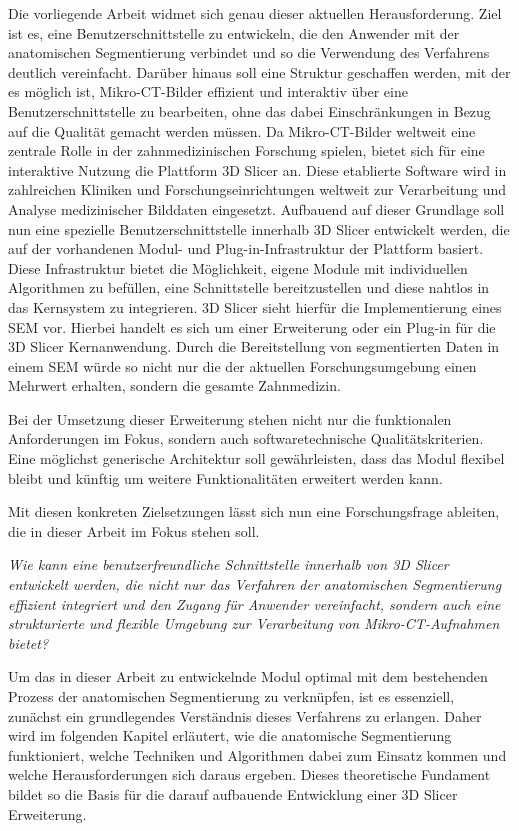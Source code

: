 Die vorliegende Arbeit widmet sich genau dieser aktuellen Herausforderung. Ziel ist
es, eine Benutzerschnittstelle zu entwickeln, die den Anwender mit der anatomischen
Segmentierung verbindet und so die Verwendung des Verfahrens deutlich vereinfacht.
Darüber hinaus soll eine Struktur geschaffen werden, mit der es möglich ist,
Mikro-\ac{CT}-Bilder effizient und interaktiv über eine Benutzerschnittstelle zu
bearbeiten, ohne das dabei Einschränkungen in Bezug auf die Qualität gemacht
werden müssen. Da Mikro-\ac{CT}-Bilder weltweit eine zentrale Rolle in der
zahnmedizinischen Forschung spielen, bietet sich für eine interaktive Nutzung die
Plattform 3D Slicer an. Diese etablierte Software wird in zahlreichen Kliniken
und Forschungseinrichtungen weltweit zur Verarbeitung und Analyse medizinischer
Bilddaten eingesetzt. Aufbauend auf dieser Grundlage soll nun eine spezielle Benutzerschnittstelle
innerhalb 3D Slicer entwickelt werden, die auf der vorhandenen Modul- und Plug-in-Infrastruktur
der Plattform basiert. Diese Infrastruktur bietet die Möglichkeit, eigene Module
mit individuellen Algorithmen zu befüllen, eine Schnittstelle bereitzustellen
und diese nahtlos in das Kernsystem zu integrieren. 3D Slicer sieht hierfür die Implementierung
eines \ac{SEM} vor. Hierbei handelt es sich um einer Erweiterung oder ein Plug-in
für die 3D Slicer Kernanwendung. Durch die Bereitstellung von segmentierten
Daten in einem \ac{SEM} würde so nicht nur die der aktuellen Forschungsumgebung einen
Mehrwert erhalten, sondern die gesamte Zahnmedizin.

Bei der Umsetzung dieser Erweiterung stehen nicht nur die funktionalen
Anforderungen im Fokus, sondern auch softwaretechnische Qualitätskriterien. Eine
möglichst generische Architektur soll gewährleisten, dass das Modul flexibel bleibt
und künftig um weitere Funktionalitäten erweitert werden kann.

Mit diesen konkreten Zielsetzungen lässt sich nun eine Forschungsfrage ableiten,
die in dieser Arbeit im Fokus stehen soll.

\begin{center}
	\textit{Wie kann eine benutzerfreundliche Schnittstelle innerhalb von 3D
	Slicer entwickelt werden, die nicht nur das Verfahren der anatomischen Segmentierung
	effizient integriert und den Zugang für Anwender vereinfacht, sondern auch
	eine strukturierte und flexible Umgebung zur Verarbeitung von Mikro-\ac{CT}-Aufnahmen
	bietet?}
\end{center}

Um das in dieser Arbeit zu entwickelnde Modul optimal mit dem bestehenden Prozess
der anatomischen Segmentierung zu verknüpfen, ist es essenziell, zunächst ein grundlegendes
Verständnis dieses Verfahrens zu erlangen. Daher wird im folgenden Kapitel
erläutert, wie die anatomische Segmentierung funktioniert, welche Techniken und
Algorithmen dabei zum Einsatz kommen und welche Herausforderungen sich daraus
ergeben. Dieses theoretische Fundament bildet so die Basis für die darauf aufbauende
Entwicklung einer 3D Slicer Erweiterung.
